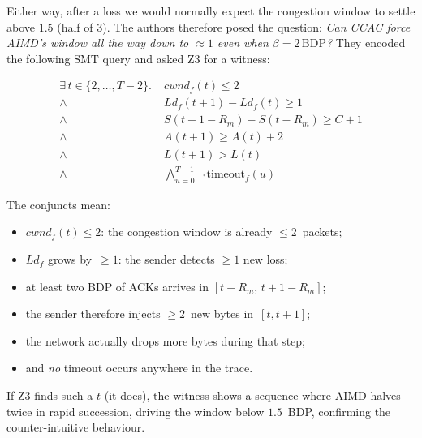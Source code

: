 \documentclass[12pt]{l4dc2023}
\begin{document}
Either way, after a loss we would normally expect the congestion window to settle above \(1.5\) (half of \(3\)).  The authors therefore posed the question:  
\emph{Can CCAC force AIMD's window all the way down to \(\approx 1\) even when \(\beta = 2\,\mathrm{BDP}\)?} They encoded the following SMT query and asked Z3 for a witness:

\begin{align*}
\exists\,t\in\{2,\dots,T\!-2\}.\;&
cwnd_f(t)\le 2\\
{}\land{}&Ld_f(t{+}1)-Ld_f(t)\ge 1\\
{}\land{}&S(t{+}1-R_m)-S(t-R_m)\ge C+1\\
{}\land{}&A(t{+}1)\ge A(t)+2\\
{}\land{}&L(t{+}1)>L(t)\\
{}\land{}&\bigwedge_{u=0}^{T-1}\neg\,\mathrm{timeout}_f(u)
\end{align*}

\vspace{-0.5\baselineskip}

\noindent
The conjuncts mean:

\begin{itemize}
\item \(cwnd_f(t)\le2\): the congestion window is already \(\le2\)~packets;
\item \(Ld_f\) grows by~\(\ge1\): the sender detects \(\ge1\) new loss;
\item at least two BDP of ACKs arrives in \([t-R_m,\,t\!+\!1-R_m]\);
\item the sender therefore injects \(\ge2\)~new bytes in~\([t,t\!+\!1]\);
\item the network actually drops more bytes during that step;
\item and \emph{no} timeout occurs anywhere in the trace.
\end{itemize}

If Z3 finds such a \(t\) (it does), the witness shows a sequence where AIMD halves twice in rapid succession, driving the window below \(1.5\)~BDP, confirming the counter-intuitive behaviour. 
\end{document}

